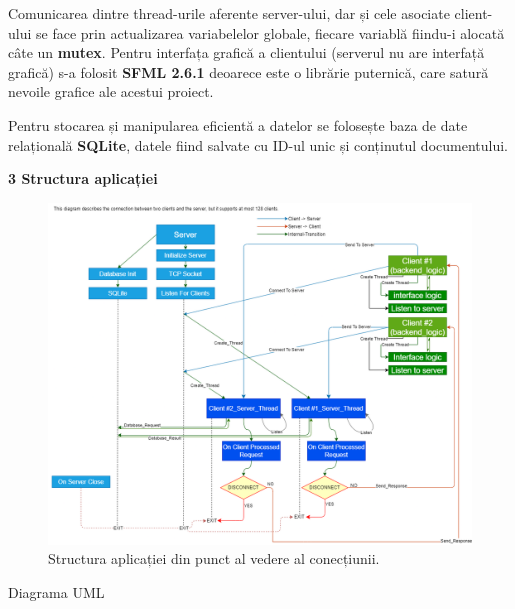 \documentclass[runningheads]{llncs}
\begin{document}
Comunicarea dintre thread-urile aferente server-ului, dar și 
cele asociate client-ului se face prin actualizarea variabelelor globale, fiecare variablă fiindu-i alocată câte un {\bf mutex}.
Pentru interfața grafică a clientului (serverul nu are interfață grafică) s-a folosit {\bf SFML 2.6.1} deoarece este o librărie puternică, care satură nevoile grafice ale acestui proiect.

Pentru stocarea și manipularea eficientă a datelor se folosește baza de date relațională {\bf SQLite}, datele fiind salvate cu ID-ul unic și conținutul documentului.
\\

\newpage

{\Large \bf 3 Structura aplicației} 
\\

\begin{figure}[htbp!]
    \hspace{-87px} 
    \includegraphics[scale=0.47]{tcp.png}
    \caption{Structura aplicației din punct al vedere al conecțiunii.}
    \label{fig:yourlabel}
\end{figure}



\newpage
{\Large Diagrama UML}
\end{document}
